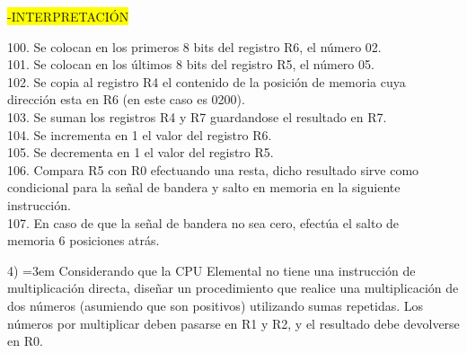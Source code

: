 \documentclass[a4paper,12pt]{article}
\begin{document}
	\newpage
	
	\hspace{1cm}\colorbox{yellow}{-INTERPRETACIÓN}
	\begin{flushleft}
		\hspace*{3cm}100. Se colocan en los primeros 8 bits del registro R6, el número 02. \\
		\hspace*{3cm}101. Se colocan en los últimos 8 bits del registro R5, el número 05. \\
		\hspace*{3cm}102. Se copia al registro R4 el contenido de la posición de memoria cuya \\
		\hspace*{3.8cm}	  dirección esta en R6 (en este caso es 0200). \\
		\hspace*{3cm}103. Se suman los registros R4 y R7 guardandose el resultado en R7. \\
		\hspace*{3cm}104. Se incrementa en 1 el valor del registro R6. \\
		\hspace*{3cm}105. Se decrementa en 1 el valor del registro R5. \\
		\hspace*{3cm}106. Compara R5 con R0 efectuando una resta, dicho resultado sirve como\\
		\hspace{3.8cm} condicional para la señal de bandera y salto en memoria en la siguiente\\
		\hspace{3.8cm} instrucción.\\
		\hspace*{3cm}107. En caso de que la señal de bandera no sea cero, efectúa el salto de\\
		\hspace{3.8cm} memoria 6 posiciones atrás. \\
	\end{flushleft}
	
	\vspace{0.8cm}
	
	4) \hangindent=3em Considerando que la CPU Elemental no tiene una instrucción de multiplicación	directa, diseñar un procedimiento que realice una multiplicación de dos números (asumiendo que son positivos) utilizando sumas repetidas. Los números por multiplicar deben pasarse en R1 y R2, y el resultado debe devolverse
	en R0.
	
\end{document}
